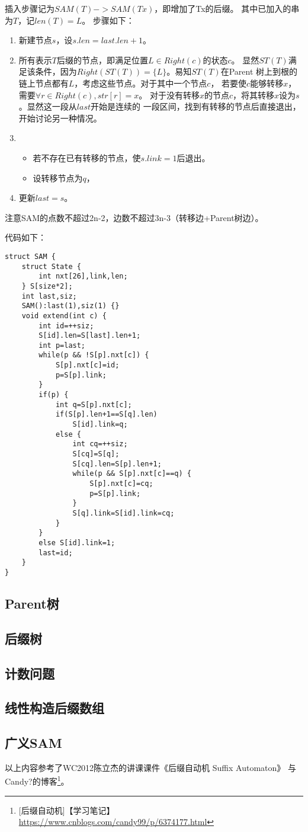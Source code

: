 插入步骤记为$SAM(T)->SAM(Tx)$，即增加了Tx的后缀。
其中已加入的串为$T$，记$len(T)=L$。
步骤如下：
\begin{enumerate}
    \item 新建节点$s$，设$s.len=last.len+1$。
    \item 所有表示$T$后缀的节点，即满足位置$L\in Right(c)$的状态$c$。
    显然$ST(T)$满足该条件，因为$Right(ST(T))=\{L\}$。易知$ST(T)$在Parent
    树上到根的链上节点都有$L$，考虑这些节点。对于其中一个节点$c$，
    若要使$c$能够转移$x$，需要$\forall{r\in Right(c)},str[r]=x$。
    对于没有转移$x$的节点$c$，将其转移$x$设为$s$。显然这一段从$last$开始是连续的
    一段区间，找到有转移的节点后直接退出，开始讨论另一种情况。
    \item \begin{itemize}
        \item 若不存在已有转移的节点，使$s.link=1$后退出。
        \item 设转移节点为$q$，
    \end{itemize}
    \item 更新$last=s$。
\end{enumerate}
注意SAM的点数不超过2n-2，边数不超过3n-3（转移边+Parent树边）。

代码如下：
\begin{lstlisting}
struct SAM {
    struct State {
        int nxt[26],link,len;
    } S[size*2];
    int last,siz;
    SAM():last(1),siz(1) {}
    void extend(int c) {
        int id=++siz;
        S[id].len=S[last].len+1;
        int p=last;
        while(p && !S[p].nxt[c]) {
            S[p].nxt[c]=id;
            p=S[p].link;
        }
        if(p) {
            int q=S[p].nxt[c];
            if(S[p].len+1==S[q].len)
                S[id].link=q;
            else {
                int cq=++siz;
                S[cq]=S[q];
                S[cq].len=S[p].len+1;
                while(p && S[p].nxt[c]==q) {
                    S[p].nxt[c]=cq;
                    p=S[p].link;
                }
                S[q].link=S[id].link=cq;
            }
        }
        else S[id].link=1;
        last=id;
    }
}
\end{lstlisting}
\subsection{Parent树}
\subsection{后缀树}
\subsection{计数问题}
\subsection{线性构造后缀数组}
\subsection{广义SAM}

以上内容参考了WC2012陈立杰的讲课课件《后缀自动机 Suffix Automaton》
与Candy?的博客\footnote{[后缀自动机]【学习笔记】
    \url{https://www.cnblogs.com/candy99/p/6374177.html}
}。
